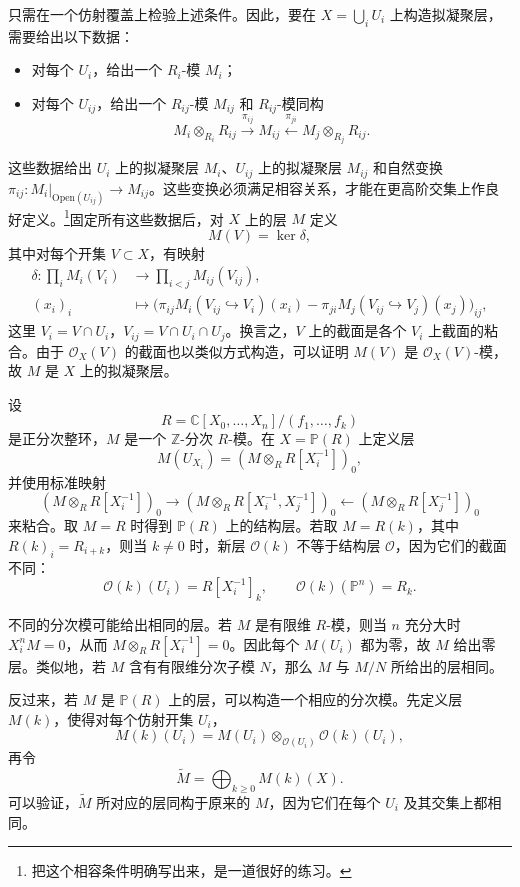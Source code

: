 只需在一个仿射覆盖上检验上述条件。因此，要在 $X=\bigcup_iU_i$ 上构造拟凝聚层，需要给出以下数据：
\begin{itemize}
  \item 对每个 $U_i$，给出一个 $R_i$-模 $M_i$；
  \item 对每个 $U_{ij}$，给出一个 $R_{ij}$-模 $M_{ij}$ 和 $R_{ij}$-模同构
  \[
    M_i\otimes_{R_i}R_{ij}\xrightarrow{\pi_{ij}}M_{ij}
    \xleftarrow{\pi_{ji}}M_j\otimes_{R_j}R_{ij}.
  \]
\end{itemize}
这些数据给出 $U_i$ 上的拟凝聚层 $M_i$、$U_{ij}$ 上的拟凝聚层 $M_{ij}$ 和自然变换 $\pi_{ij}\colon M_i|_{\mathrm{Open}(U_{ij})}\to M_{ij}$。这些变换必须满足相容关系，才能在更高阶交集上作良好定义。\footnote{把这个相容条件明确写出来，是一道很好的练习。}固定所有这些数据后，对 $X$ 上的层 $M$ 定义
\[
  M(V)=\ker\delta,
\]
其中对每个开集 $V\subset X$，有映射
\[
  \begin{aligned}
  \delta\colon\prod_iM_i(V_i)&\longrightarrow\prod_{i<j}M_{ij}(V_{ij}),\\
  (x_i)_i&\longmapsto
  \bigl(\pi_{ij}M_i(V_{ij}\hookrightarrow V_i)(x_i)
       -\pi_{ji}M_j(V_{ij}\hookrightarrow V_j)(x_j)\bigr)_{ij},
  \end{aligned}
\]
这里 $V_i=V\cap U_i$，$V_{ij}=V\cap U_i\cap U_j$。换言之，$V$ 上的截面是各个 $V_i$ 上截面的粘合。由于 $\mathcal O_X(V)$ 的截面也以类似方式构造，可以证明 $M(V)$ 是 $\mathcal O_X(V)$-模，故 $M$ 是 $X$ 上的拟凝聚层。

\begin{example}[射影簇上的层与分次模]
设
\[
  R=\mathbb C[X_0,\ldots,X_n]/(f_1,\ldots,f_k)
\]
是正分次整环，$M$ 是一个 $\mathbb Z$-分次 $R$-模。在 $X=\mathbb P(R)$ 上定义层
\[
  M(U_{X_i})=(M\otimes_RR[X_i^{-1}])_0,
\]
并使用标准映射
\[
  (M\otimes_RR[X_i^{-1}])_0\longrightarrow
  (M\otimes_RR[X_i^{-1},X_j^{-1}])_0
  \longleftarrow(M\otimes_RR[X_j^{-1}])_0
\]
来粘合。取 $M=R$ 时得到 $\mathbb P(R)$ 上的结构层。若取 $M=R(k)$，其中 $R(k)_i=R_{i+k}$，则当 $k\ne0$ 时，新层 $\mathcal O(k)$ 不等于结构层 $\mathcal O$，因为它们的截面不同：
\[
  \mathcal O(k)(U_i)=R[X_i^{-1}]_k,
  \qquad \mathcal O(k)(\mathbb P^n)=R_k.
\]

不同的分次模可能给出相同的层。若 $M$ 是有限维 $R$-模，则当 $n$ 充分大时 $X_i^nM=0$，从而 $M\otimes_RR[X_i^{-1}]=0$。因此每个 $M(U_i)$ 都为零，故 $M$ 给出零层。类似地，若 $M$ 含有有限维分次子模 $N$，那么 $M$ 与 $M/N$ 所给出的层相同。

反过来，若 $M$ 是 $\mathbb P(R)$ 上的层，可以构造一个相应的分次模。先定义层 $M(k)$，使得对每个仿射开集 $U_i$，
\[
  M(k)(U_i)=M(U_i)\otimes_{\mathcal O(U_i)}\mathcal O(k)(U_i),
\]
再令
\[
  \widetilde M=\bigoplus_{k\ge0}M(k)(X).
\]
可以验证，$\widetilde M$ 所对应的层同构于原来的 $M$，因为它们在每个 $U_i$ 及其交集上都相同。
\end{example}

